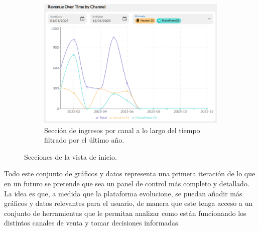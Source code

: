 \begin{figure}[H]
\begin{subfigure}{0.48\linewidth}
        \centering
        \includegraphics[width=\linewidth]{figures/design_develop/screenshots/dash_sec4.png}
        \caption{Sección de ingresos por canal a lo largo del tiempo filtrado por el último año.}
    \end{subfigure}
    \par\vspace{0.3cm}
    \caption{Secciones de la vista de inicio.}
    \label{fig:dev:ss:vista_inicio_secciones}
\end{figure}


Todo este conjunto de gráficos y datos representa una primera iteración de lo que en un futuro se pretende que sea un panel de control más completo y detallado. La idea es que, a medida que la plataforma evolucione, se puedan añadir más gráficos y datos relevantes para el usuario, de manera que este tenga acceso a un conjunto de herramientas que le permitan analizar como están funcionando los distintos canales de venta y tomar decisiones informadas.